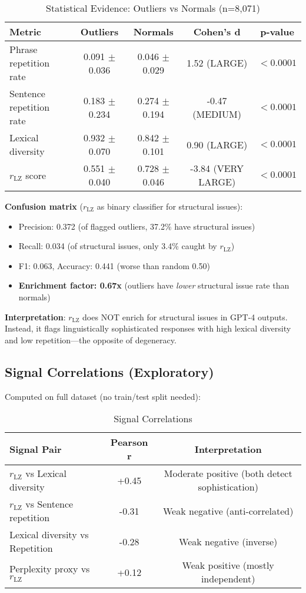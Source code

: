 \documentclass[11pt]{article}
\begin{document}
\begin{table}[h]
\centering
\caption{Statistical Evidence: Outliers vs Normals (n=8,071)}
\label{tab:stats}
\begin{tabular}{lcccc}
\toprule
\textbf{Metric} & \textbf{Outliers} & \textbf{Normals} & \textbf{Cohen's d} & \textbf{p-value} \\
\midrule
Phrase repetition rate & 0.091 $\pm$ 0.036 & 0.046 $\pm$ 0.029 & 1.52 (LARGE) & $<0.0001$ \\
Sentence repetition rate & 0.183 $\pm$ 0.234 & 0.274 $\pm$ 0.194 & -0.47 (MEDIUM) & $<0.0001$ \\
Lexical diversity & 0.932 $\pm$ 0.070 & 0.842 $\pm$ 0.101 & 0.90 (LARGE) & $<0.0001$ \\
$r_{\text{LZ}}$ score & 0.551 $\pm$ 0.040 & 0.728 $\pm$ 0.046 & -3.84 (VERY LARGE) & $<0.0001$ \\
\bottomrule
\end{tabular}
\end{table}

\textbf{Confusion matrix} ($r_{\text{LZ}}$ as binary classifier for structural issues):
\begin{itemize}
\item Precision: 0.372 (of flagged outliers, 37.2\% have structural issues)
\item Recall: 0.034 (of structural issues, only 3.4\% caught by $r_{\text{LZ}}$)
\item F1: 0.063, Accuracy: 0.441 (worse than random 0.50)
\item \textbf{Enrichment factor: 0.67x} (outliers have \textit{lower} structural issue rate than normals)
\end{itemize}

\textbf{Interpretation}: $r_{\text{LZ}}$ does NOT enrich for structural issues in GPT-4 outputs. Instead, it flags linguistically sophisticated responses with high lexical diversity and low repetition---the opposite of degeneracy.

\subsection{Signal Correlations (Exploratory)}

Computed on full dataset (no train/test split needed):

\begin{table}[h]
\centering
\caption{Signal Correlations}
\label{tab:correlations}
\begin{tabular}{lcc}
\toprule
\textbf{Signal Pair} & \textbf{Pearson r} & \textbf{Interpretation} \\
\midrule
$r_{\text{LZ}}$ vs Lexical diversity & +0.45 & Moderate positive (both detect sophistication) \\
$r_{\text{LZ}}$ vs Sentence repetition & -0.31 & Weak negative (anti-correlated) \\
Lexical diversity vs Repetition & -0.28 & Weak negative (inverse) \\
Perplexity proxy vs $r_{\text{LZ}}$ & +0.12 & Weak positive (mostly independent) \\
\bottomrule
\end{tabular}
\end{table}
\end{document}
